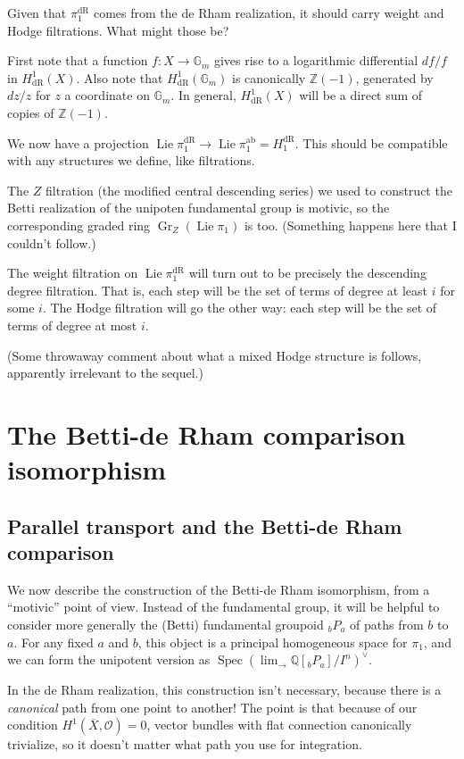 \documentclass[12pt]{article}
\def\GG{\mathbb{G}}
\def\QQ{\mathbb{Q}}
\def\ZZ{\mathbb{Z}}
\def\calO{\mathcal{O}}
\def\dual{\vee}
\DeclareMathOperator{\ab}{ab}
\DeclareMathOperator{\dR}{dR}
\DeclareMathOperator{\Gr}{Gr}
\DeclareMathOperator{\Lie}{Lie}
\DeclareMathOperator{\Spec}{Spec}
\begin{document}
Given that $\pi_1^{\dR}$ comes from the de Rham realization, it should
carry weight and Hodge filtrations. What might those be?

First note that a function $f: X \to \GG_m$ gives rise to a logarithmic
differential $df/f$ in $H^1_{\dR}(X)$. Also note that $H^1_{\dR}(\GG_m)$
is canonically $\ZZ(-1)$, generated by $dz/z$ for $z$ a coordinate
on $\GG_m$. In general, $H^1_{\dR}(X)$ will be a direct sum of copies
of $\ZZ(-1)$.

We now have a projection $\Lie \pi_1^{\dR} \to \Lie \pi_1^{\ab} = H_1^{\dR}$.
This should be compatible with any structures we define, like filtrations.

The $Z$ filtration (the modified central descending series) we used to
construct the Betti realization of the unipoten fundamental group is
motivic, so the corresponding graded ring $\Gr_Z(\Lie \pi_1)$ is too.
(Something happens here that I couldn't follow.)

The weight filtration on $\Lie \pi_1^{\dR}$ will turn out to be precisely
the descending degree filtration. That is, each step will be the set of
terms of degree at least $i$ for some $i$. The Hodge filtration will go
the other way: each step will be the set of terms of degree at most $i$.

(Some throwaway comment about what a mixed Hodge structure is follows,
apparently irrelevant to the sequel.)

\section{The Betti-de Rham comparison isomorphism}

\subsection*{Parallel transport and the Betti-de Rham comparison}

We now describe the construction of the Betti-de Rham isomorphism,
from a ``motivic'' point of view. Instead of the fundamental group,
it will be helpful to consider more generally the (Betti) fundamental
groupoid ${}_bP_a$ of paths from $b$ to $a$. For any fixed $a$ and $b$,
this object is a principal homogeneous space for $\pi_1$, and we
can form the unipotent version as $\Spec (\lim_{\rightarrow} 
\QQ[{}_bP_a]/I^n)^\dual$.

In the de Rham realization, this construction isn't necessary, because
there is a \emph{canonical} path from one point to another! The point
is that because of our condition $H^1(\overline{X}, \calO) = 0$,
vector bundles with flat connection canonically trivialize, so it doesn't 
matter what path you use for integration.
\end{document}
